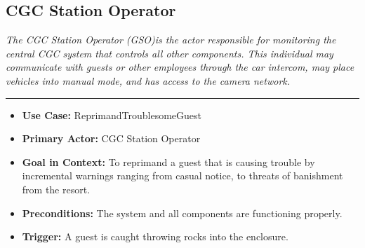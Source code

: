 \documentclass[12pt]{article}
\begin{document}
    \subsection{CGC Station Operator}
    \textit{The CGC Station Operator  (GSO)is the actor responsible for monitoring the central CGC system that
    controls all other components. This individual may communicate with guests or other employees 
    through the car intercom, may place vehicles into manual mode, and has access to the camera network.}
    \par\noindent\rule{\textwidth}{0.4pt}    
    \begin{itemize}
        \item[]\textbf{Use Case:}                                
            ReprimandTroublesomeGuest

        \item[]\textbf{Primary Actor:}
            CGC Station Operator

        \item[]\textbf{Goal in Context:}
            To reprimand a guest that is causing trouble by incremental warnings ranging from
            casual notice, to threats of banishment from the resort.

        \item[]\textbf{Preconditions:}
            The system and all components are functioning properly.

        \item[]\textbf{Trigger:}
            A guest is caught throwing rocks into the enclosure.
            

\end{itemize}
\end{document}
